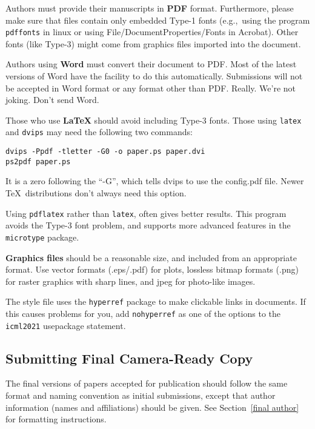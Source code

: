 \documentclass{article}
\begin{document}
\medskip

Authors must provide their manuscripts in \textbf{PDF} format.
Furthermore, please make sure that files contain only embedded Type-1 fonts
(e.g.,~using the program \texttt{pdffonts} in linux or using
File/DocumentProperties/Fonts in Acrobat). Other fonts (like Type-3)
might come from graphics files imported into the document.

Authors using \textbf{Word} must convert their document to PDF\@. Most
of the latest versions of Word have the facility to do this
automatically. Submissions will not be accepted in Word format or any
format other than PDF\@. Really. We're not joking. Don't send Word.

Those who use \textbf{\LaTeX} should avoid including Type-3 fonts.
Those using \texttt{latex} and \texttt{dvips} may need the following
two commands:

{\footnotesize
\begin{verbatim}
dvips -Ppdf -tletter -G0 -o paper.ps paper.dvi
ps2pdf paper.ps
\end{verbatim}}
It is a zero following the ``-G'', which tells dvips to use
the config.pdf file. Newer \TeX\ distributions don't always need this
option.

Using \texttt{pdflatex} rather than \texttt{latex}, often gives better
results. This program avoids the Type-3 font problem, and supports more
advanced features in the \texttt{microtype} package.

\textbf{Graphics files} should be a reasonable size, and included from
an appropriate format. Use vector formats (.eps/.pdf) for plots,
lossless bitmap formats (.png) for raster graphics with sharp lines, and
jpeg for photo-like images.

The style file uses the \texttt{hyperref} package to make clickable
links in documents. If this causes problems for you, add
\texttt{nohyperref} as one of the options to the \texttt{icml2021}
usepackage statement.


\subsection{Submitting Final Camera-Ready Copy}

The final versions of papers accepted for publication should follow the
same format and naming convention as initial submissions, except that
author information (names and affiliations) should be given. See
Section~\ref{final author} for formatting instructions.
\end{document}
